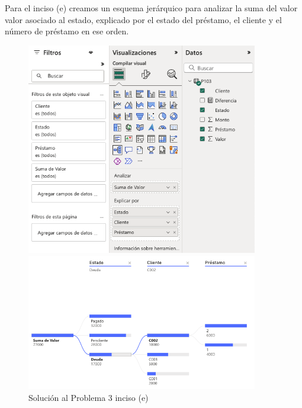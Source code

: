 \documentclass{article}
\begin{document}
\noindent
Para el inciso (e) creamos un esquema jerárquico para analizar la suma del valor valor asociado al estado, explicado por el estado del préstamo, el cliente y el número de préstamo en ese orden.
\begin{figure}[!ht]
    \centering
    \begin{minipage}{\textwidth}
        \centering
        \includegraphics[width=0.9\textwidth]{figures/s103e-1.png}
    \end{minipage}
    \hfill
    \begin{minipage}{\textwidth}
        \centering
        \includegraphics[width=0.9\textwidth]{figures/s103e-2.png}
    \end{minipage}
    \captionsetup{width=0.9\textwidth}
    \caption{Solución al Problema 3 inciso (e)}
    \label{fig:s103e}
\end{figure}
\end{document}
